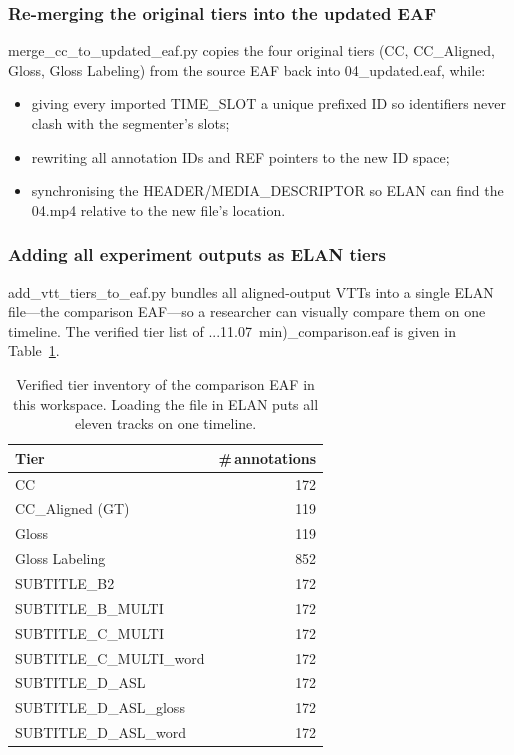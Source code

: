 \documentclass[11pt,a4paper]{article}
\def\texttt#1{#1}%
\def\textbf#1{#1}%
\def\emph#1{#1}%
\begin{document}
\subsubsection{Re-merging the original tiers into the updated EAF}
\texttt{merge\_cc\_to\_updated\_eaf.py} copies the four original tiers
(\texttt{CC}, \texttt{CC\_Aligned}, \texttt{Gloss}, \texttt{Gloss Labeling})
from the source EAF back into \texttt{04\_updated.eaf}, while:
\begin{itemize}[leftmargin=1.5em]
  \item giving every imported \texttt{TIME\_SLOT} a unique prefixed ID so
        identifiers never clash with the segmenter's slots;
  \item rewriting all annotation \texttt{ID}s and \texttt{REF} pointers to
        the new ID space;
  \item synchronising the \texttt{HEADER/MEDIA\_DESCRIPTOR} so ELAN can
        find the \texttt{04.mp4} relative to the new file's location.
\end{itemize}

\subsubsection{Adding all experiment outputs as ELAN tiers}
\label{sec:add-tiers}
\texttt{add\_vtt\_tiers\_to\_eaf.py} bundles \emph{all} aligned-output VTTs
into a single ELAN file---the \emph{comparison EAF}---so a researcher can
visually compare them on one timeline. The verified tier list of
\texttt{...11.07~min)\_comparison.eaf} is given in
Table~\ref{tab:comparison-eaf}.

\begin{table}[h]
\centering
\small
\begin{tabular}{lr}
\toprule
\textbf{Tier} & \textbf{\#\,annotations} \\
\midrule
\texttt{CC}                           & 172 \\
\texttt{CC\_Aligned} (GT)             & 119 \\
\texttt{Gloss}                        & 119 \\
\texttt{Gloss Labeling}               & 852 \\
\texttt{SUBTITLE\_B2}                 & 172 \\
\texttt{SUBTITLE\_B\_MULTI}           & 172 \\
\texttt{SUBTITLE\_C\_MULTI}           & 172 \\
\texttt{SUBTITLE\_C\_MULTI\_word}     & 172 \\
\texttt{SUBTITLE\_D\_ASL}             & 172 \\
\texttt{SUBTITLE\_D\_ASL\_gloss}      & 172 \\
\texttt{SUBTITLE\_D\_ASL\_word}       & 172 \\
\bottomrule
\end{tabular}
\caption{Verified tier inventory of the comparison EAF in this workspace.
Loading the file in ELAN puts all eleven tracks on one timeline.}
\label{tab:comparison-eaf}
\end{table}
\end{document}

